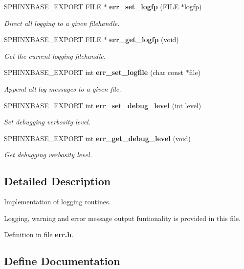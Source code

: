 \begin{CompactItemize}
\item 
SPHINXBASE\_\-EXPORT FILE $\ast$ {\bf err\_\-set\_\-logfp} (FILE $\ast$logfp)
\begin{CompactList}\small\item\em Direct all logging to a given filehandle. \item\end{CompactList}\item 
SPHINXBASE\_\-EXPORT FILE $\ast$ {\bf err\_\-get\_\-logfp} (void)
\begin{CompactList}\small\item\em Get the current logging filehandle. \item\end{CompactList}\item 
SPHINXBASE\_\-EXPORT int {\bf err\_\-set\_\-logfile} (char const $\ast$file)
\begin{CompactList}\small\item\em Append all log messages to a given file. \item\end{CompactList}\item 
SPHINXBASE\_\-EXPORT int {\bf err\_\-set\_\-debug\_\-level} (int level)
\begin{CompactList}\small\item\em Set debugging verbosity level. \item\end{CompactList}\item 
SPHINXBASE\_\-EXPORT int {\bf err\_\-get\_\-debug\_\-level} (void)
\begin{CompactList}\small\item\em Get debugging verbosity level. \item\end{CompactList}\end{CompactItemize}


\subsection{Detailed Description}
Implementation of logging routines. 

Logging, warning and error message output funtionality is provided in this file. 

Definition in file {\bf err.h}.

\subsection{Define Documentation}
